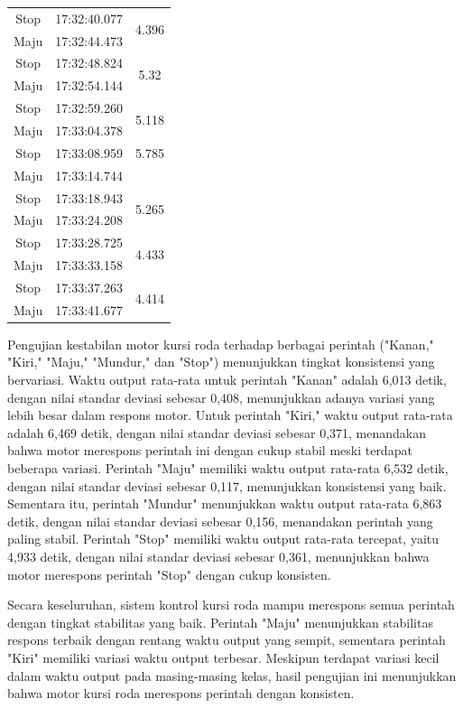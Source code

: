 \begin{longtable}{|c|c|c|}
  Stop           & 17:32:40.077        & \multirow{2}{*}{4.396}  \\ \cline{1-2}
  Maju           & 17:32:44.473        &                         \\ \hline
  Stop           & 17:32:48.824        & \multirow{2}{*}{5.32}   \\ \cline{1-2}
  Maju           & 17:32:54.144        &                         \\ \hline
  Stop           & 17:32:59.260        & \multirow{2}{*}{5.118}  \\ \cline{1-2}
  Maju           & 17:33:04.378        &                         \\ \hline
  Stop           & 17:33:08.959        & 5.785  \\ \hline
  Maju           & 17:33:14.744        &                         \\ \hline
  Stop           & 17:33:18.943        & \multirow{2}{*}{5.265}  \\ \cline{1-2}
  Maju           & 17:33:24.208        &                         \\ \hline
  Stop           & 17:33:28.725        & \multirow{2}{*}{4.433}  \\ \cline{1-2}
  Maju           & 17:33:33.158        &                         \\ \hline
  Stop           & 17:33:37.263        & \multirow{2}{*}{4.414}  \\ \cline{1-2}
  Maju           & 17:33:41.677        &                         \\ \hline
\end{longtable}

Pengujian kestabilan motor kursi roda terhadap berbagai perintah ("Kanan," "Kiri," "Maju," "Mundur," dan "Stop") menunjukkan tingkat konsistensi yang bervariasi. Waktu output rata-rata untuk perintah "Kanan" adalah 6,013 detik, dengan nilai standar deviasi sebesar 0,408, menunjukkan adanya variasi yang lebih besar dalam respons motor. Untuk perintah "Kiri," waktu output rata-rata adalah 6,469 detik, dengan nilai standar deviasi sebesar 0,371, menandakan bahwa motor merespons perintah ini dengan cukup stabil meski terdapat beberapa variasi. Perintah "Maju" memiliki waktu output rata-rata 6,532 detik, dengan nilai standar deviasi sebesar 0,117, menunjukkan konsistensi yang baik. Sementara itu, perintah "Mundur" menunjukkan waktu output rata-rata 6,863 detik, dengan nilai standar deviasi sebesar 0,156, menandakan perintah yang paling stabil. Perintah "Stop" memiliki waktu output rata-rata tercepat, yaitu 4,933 detik, dengan nilai standar deviasi sebesar 0,361, menunjukkan bahwa motor merespons perintah "Stop" dengan cukup konsisten.

Secara keseluruhan, sistem kontrol kursi roda mampu merespons semua perintah dengan tingkat stabilitas yang baik. Perintah "Maju" menunjukkan stabilitas respons terbaik dengan rentang waktu output yang sempit, sementara perintah "Kiri" memiliki variasi waktu output terbesar. Meskipun terdapat variasi kecil dalam waktu output pada masing-masing kelas, hasil pengujian ini menunjukkan bahwa motor kursi roda merespons perintah dengan konsisten.